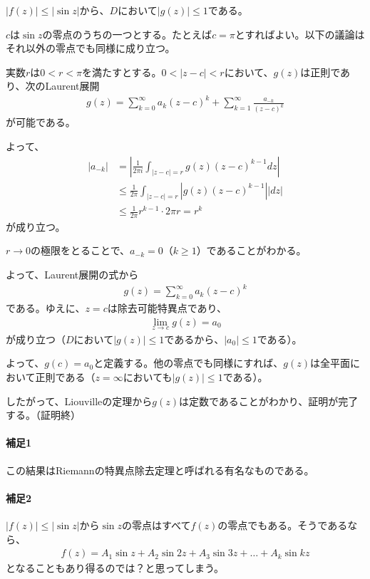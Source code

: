 $|f(z)|\le|\sin z|$から、$D$において$|g(z)|\le1$である。

$c$は$\sin z$の零点のうちの一つとする。たとえば$c=\pi$とすればよい。以下の議論はそれ以外の零点でも同様に成り立つ。

実数$r$は$0<r<\pi$を満たすとする。$0<|z-c|<r$において、$g(z)$は正則であり、次のLaurent展開
\begin{align*}
    g(z)=\sum_{k=0}^{\infty}a_k(z-c)^k+\sum_{k=1}^{\infty}\frac{a_{-k}}{(z-c)^k}
\end{align*}
が可能である。

よって、
\begin{align*}
    |a_{-k}|
    &=\left|\frac{1}{2\pi i}\int_{|z-c|=r}g(z)(z-c)^{k-1}dz\right|\\
    &\le\frac{1}{2\pi}\int_{|z-c|=r}\left|g(z)(z-c)^{k-1}\right||dz|\\
    &\le\frac{1}{2\pi}r^{k-1}\cdot2\pi r
    =r^k
\end{align*}
が成り立つ。

$r\longrightarrow0$の極限をとることで、$a_{-k}=0$（$k\ge1$）であることがわかる。

よって、Laurent展開の式から
\begin{align*}
    g(z)=\sum_{k=0}^{\infty}a_k(z-c)^k
\end{align*}
である。ゆえに、$z=c$は除去可能特異点であり、
\begin{align*}
    \lim_{z\rightarrow c}g(z)=a_0
\end{align*}
が成り立つ（$D$において$|g(z)|\le1$であるから、$|a_0|\le1$である）。

よって、$g(c)=a_0$と定義する。他の零点でも同様にすれば、$g(z)$は全平面において正則である（$z=\infty$においても$|g(z)|\le1$である）。

したがって、Liouvilleの定理から$g(z)$は定数であることがわかり、証明が完了する。（証明終）

\paragraph{補足1}
この結果はRiemannの特異点除去定理と呼ばれる有名なものである。

\paragraph{補足2}
$|f(z)|\le|\sin z|$から$\sin z$の零点はすべて$f(z)$の零点でもある。そうであるなら、
\begin{align*}
    f(z)=A_1\sin z+A_2\sin 2z+A_3\sin 3z+\dots+A_k\sin kz
\end{align*}
となることもあり得るのでは？と思ってしまう。

